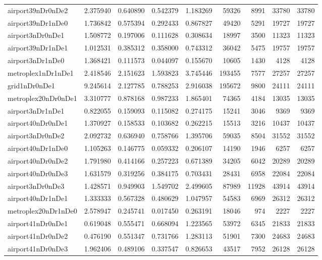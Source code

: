 \begin{longtable}{|l|r|r|r|r|r|r|r|r|}
airport39nDr0nDe2 & 2.375940 & 0.640890 & 0.542379 & 1.183269 & 59326 & 8991 & 33780 & 33780 \\
airport39nDr1nDe0 & 1.736842 & 0.575394 & 0.292433 & 0.867827 & 49420 & 5291 & 19727 & 19727 \\
airport3nDr0nDe1 & 1.508772 & 0.197006 & 0.111628 & 0.308634 & 18997 & 3500 & 11323 & 11323 \\
airport39nDr1nDe1 & 1.012531 & 0.385312 & 0.358000 & 0.743312 & 36042 & 5475 & 19757 & 19757 \\
airport3nDr1nDe0 & 1.368421 & 0.111573 & 0.044097 & 0.155670 & 10605 & 1430 & 4128 & 4128 \\
metroplex1nDr1nDe1 & 2.418546 & 2.151623 & 1.593823 & 3.745446 & 193455 & 7577 & 27257 & 27257 \\
grid1nDr0nDe1 & 9.245614 & 2.127785 & 0.788253 & 2.916038 & 195672 & 9800 & 24111 & 24111 \\
metroplex20nDr0nDe1 & 3.310777 & 0.878168 & 0.987233 & 1.865401 & 74365 & 4184 & 13035 & 13035 \\
airport3nDr1nDe1 & 0.822055 & 0.159093 & 0.115082 & 0.274175 & 15241 & 3046 & 9369 & 9369 \\
airport40nDr0nDe1 & 1.370927 & 0.158533 & 0.103682 & 0.262215 & 15513 & 3216 & 10437 & 10437 \\
airport3nDr0nDe2 & 2.092732 & 0.636940 & 0.758766 & 1.395706 & 59035 & 8504 & 31552 & 31552 \\
airport40nDr1nDe0 & 1.105263 & 0.146775 & 0.059332 & 0.206107 & 14190 & 1946 & 6257 & 6257 \\
airport40nDr0nDe2 & 1.791980 & 0.414166 & 0.257223 & 0.671389 & 34205 & 6042 & 20289 & 20289 \\
airport40nDr0nDe3 & 1.631579 & 0.319256 & 0.384175 & 0.703431 & 28431 & 6958 & 22084 & 22084 \\
airport3nDr0nDe3 & 1.428571 & 0.949903 & 1.549702 & 2.499605 & 87989 & 11928 & 43914 & 43914 \\
airport40nDr1nDe1 & 1.333333 & 0.567328 & 0.480629 & 1.047957 & 54583 & 6969 & 26312 & 26312 \\
metroplex20nDr1nDe0 & 2.578947 & 0.245741 & 0.017450 & 0.263191 & 18046 & 974 & 2227 & 2227 \\
airport41nDr0nDe1 & 0.619048 & 0.555471 & 0.668094 & 1.223565 & 53972 & 6345 & 21833 & 21833 \\
airport41nDr0nDe2 & 0.476190 & 0.551347 & 0.731766 & 1.283113 & 51901 & 7300 & 24683 & 24683 \\
airport41nDr0nDe3 & 1.962406 & 0.489106 & 0.337547 & 0.826653 & 43517 & 7952 & 26128 & 26128 \\

\end{longtable}
